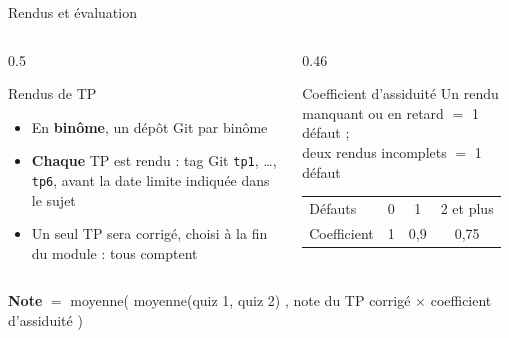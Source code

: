 \documentclass[aspectratio=169,10pt]{beamer}
\begin{document}
\begin{frame}{Rendus et évaluation}
  \begin{columns}[T]
    \begin{column}{0.5\textwidth}
      \begin{block}{Rendus de TP}
        \begin{itemize}
          \item En \textbf{binôme}, un dépôt Git par binôme
          \item \textbf{Chaque} TP est rendu : tag Git \texttt{tp1}, \ldots, \texttt{tp6}, avant la date limite indiquée dans le sujet
          \item Un seul TP sera corrigé, choisi à la fin du module : \alert{tous comptent}
        \end{itemize}
      \end{block}
    \end{column}
    \begin{column}{0.46\textwidth}
      \begin{block}{Coefficient d'assiduité}
        \small
        Un rendu manquant ou en retard $=$ 1 défaut ;\\ deux rendus incomplets $=$ 1 défaut
        \vspace{1mm}
        \begin{center}
        \begin{tabular}{@{}lccc@{}}
          \toprule
          Défauts & 0 & 1 & 2 et plus \\
          Coefficient & 1 & 0,9 & 0,75 \\
          \bottomrule
        \end{tabular}
        \end{center}
      \end{block}
    \end{column}
  \end{columns}
  \vspace{3mm}
  \begin{datacard}
    \textbf{Note} $=$ moyenne\big( moyenne(quiz 1, quiz 2) , note du TP corrigé $\times$ coefficient d'assiduité \big)
  \end{datacard}
\end{frame}
\end{document}
